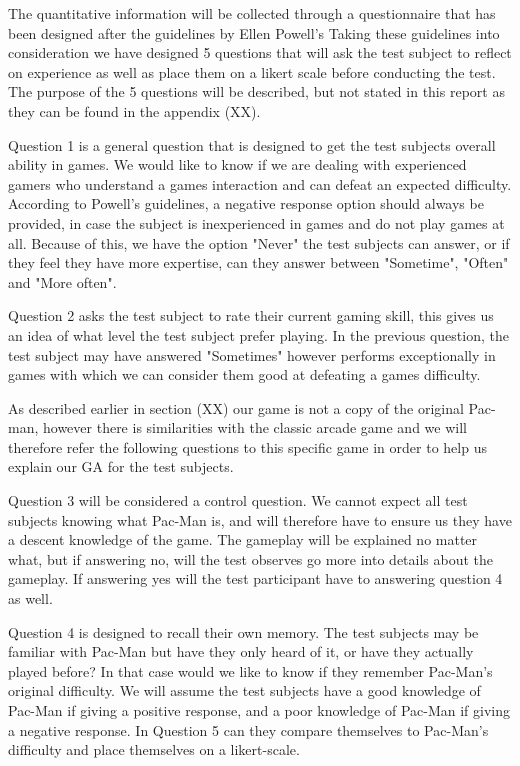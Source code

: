 The quantitative information will be collected through a questionnaire that has been designed after the guidelines by Ellen Powell's  \cite{Taylor-Powell1998} Taking these guidelines into consideration we have designed 5 questions that will ask the test subject to reflect on experience as well as place them on a likert scale before conducting the test. The purpose of the 5 questions will be described, but not stated in this report as they can be found in the appendix (XX).

Question 1 is a general question that is designed to get the test subjects overall ability in games. We would like to know if we are dealing with experienced gamers who understand a games interaction and can defeat an expected difficulty. According to Powell's guidelines, a negative response option should always be provided, in case the subject is inexperienced in games and do not play games at all. Because of this, we have the option "Never" the test subjects can answer, or if they feel they have more expertise, can they answer between "Sometime", "Often" and "More often".

Question 2 asks the test subject to rate their current gaming skill, this gives us an idea of what level the test subject prefer playing. In the previous question, the test subject may have answered "Sometimes" however performs exceptionally in games with which we can consider them good at defeating a games difficulty.

As described earlier in section (XX) our game is not a copy of the original Pac-man, however there is similarities with the classic arcade game and we will therefore refer the following questions to this specific game in order to help us explain our GA for the test subjects.

Question 3 will be considered a control question. We cannot expect all test subjects knowing what Pac-Man is, and will therefore have to ensure us they have a descent knowledge of the game. The gameplay will be explained no matter what, but if answering no, will the test observes go more into details about the gameplay. If answering yes will the test participant have to answering question 4 as well.

Question 4 is designed to recall their own memory. The test subjects may be familiar with Pac-Man but have they only heard of it, or have they actually played before? In that case would we like to know if they remember Pac-Man's original difficulty. We will assume the test subjects have a good knowledge of Pac-Man if giving a positive response, and a poor knowledge of Pac-Man if giving a negative response. In Question 5 can they compare themselves to Pac-Man's difficulty and place themselves on a likert-scale.

